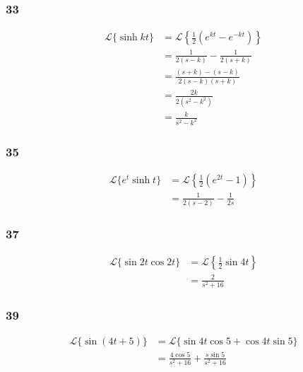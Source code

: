 \documentclass{article}
\begin{document}
\subsubsection{33}

\begin{align*}
  \mathcal{L}\{\sinh k t\} & = \mathcal{L} \left\{ \frac{1}{2} (e^{k t} - e^{-k t}) \right\} \\
                           & = \frac{1}{2 (s - k)} - \frac{1}{2 (s + k)}                     \\
                           & = \frac{(s + k) - (s - k)}{2 (s - k) (s + k)}                   \\
                           & = \frac{2 k}{2 (s^2 - k^2)}                                     \\
                           & = \frac{k}{s^2 - k^2}
\end{align*}

\subsubsection{35}

\begin{align*}
  \mathcal{L}\{e^t \sinh t\} & = \mathcal{L} \left\{ \frac{1}{2} (e^{2 t} - 1) \right\} \\
                             & = \frac{1}{2 (s - 2)} - \frac{1}{2 s}
\end{align*}

\subsubsection{37}

\begin{align*}
  \mathcal{L}\{\sin 2t \cos 2t\} & = \mathcal{L} \left\{ \frac{1}{2} \sin 4 t \right\} \\
                                 & = \frac{2}{s^2 + 16}
\end{align*}

\subsubsection{39}

\begin{align*}
  \mathcal{L}\{\sin (4 t + 5)\} & = \mathcal{L}\{\sin 4 t \cos 5 + \cos 4 t \sin 5\}      \\
                                & = \frac{4 \cos 5}{s^2 + 16} + \frac{s \sin 5}{s^2 + 16}
\end{align*}
\end{document}
